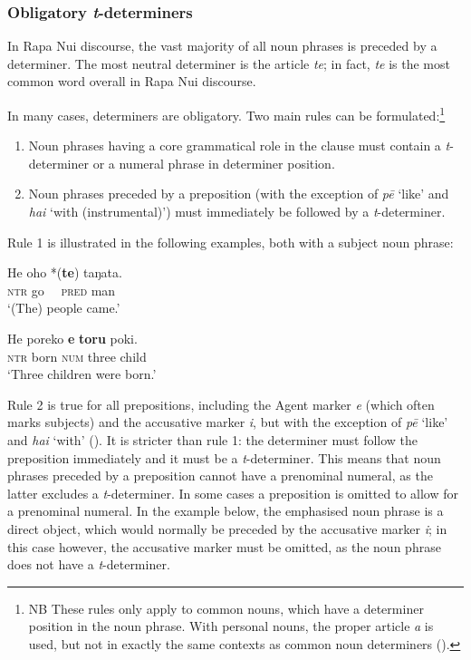 \subsubsection{Obligatory \textit{t}-determiners}\label{sec:5.3.2.1}

In Rapa Nui discourse, the vast majority of all noun phrases is preceded by a determiner. The most neutral determiner is the article \textit{te}; in fact, \textit{te} is the most common word overall in Rapa Nui discourse.

In many cases, determiners are obligatory. Two main rules can be formulated:\footnote{\label{fn:246}NB These rules only apply to common nouns, which have a determiner position in the noun phrase. With personal nouns, the proper article \textit{a} is used, but not in exactly the same contexts as common noun determiners ().}

\begin{enumerate}
\item
Noun phrases having a core grammatical role in the clause must contain a \textit{t}-determiner or a numeral phrase in determiner position. 
\item 
Noun phrases preceded by a preposition (with the exception of \textit{pē} ‘like’ and \textit{hai} ‘with (instrumental)’) must immediately be followed by a \textit{t}-determiner. 
\end{enumerate}

Rule 1 is illustrated in the following examples, both with a subject noun phrase:

\ea\label{ex:5.14}
\gll He oho *(\textbf{te}) taŋata. \\
\textsc{ntr} go \textsc{~~pred} man \\

\glt
‘(The) people came.’ \textstyleExampleref{[R648.165]} 
\z

\ea\label{ex:5.15}
\gll He poreko \textbf{e} \textbf{toru} poki. \\
\textsc{ntr} born \textsc{num} three child \\

\glt
‘Three children were born.’ \textstyleExampleref{[R352.010]} 
\z

Rule 2 is true for all prepositions, including the Agent marker \textit{e} (which often marks subjects) and the accusative marker \textit{i}, but with the exception of \textit{pē} ‘like’ and \textit{hai} ‘with’ (). It is stricter than rule 1: the determiner must follow the preposition immediately and it must be a \textit{t}-determiner. This means that noun phrases preceded by a preposition cannot have a prenominal numeral, as the latter excludes a \textit{t}{}-determiner. In some cases a preposition is omitted to allow for a prenominal numeral. In the example below, the emphasised noun phrase is a direct object, which would normally be preceded by the accusative marker \textit{i}; in this case however, the accusative marker must be omitted, as the noun phrase does not have a \textit{t}-determiner.


